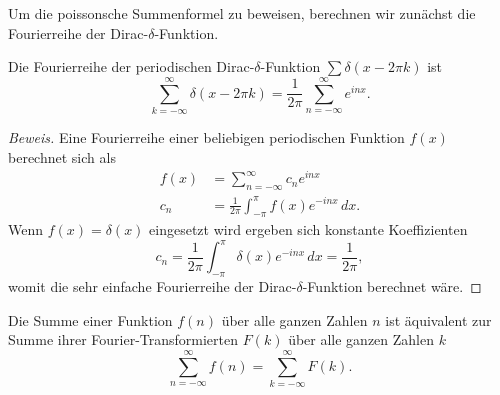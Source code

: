 Um die poissonsche Summenformel zu beweisen, berechnen wir zunächst die Fourierreihe der Dirac-$\delta$-Funktion.

\begin{lemma}
    Die Fourierreihe der periodischen Dirac-$\delta$-Funktion $\sum \delta(x - 2\pi k)$ ist
    \begin{equation} \label{zeta:equation:fourier_dirac}
        \sum_{k=-\infty}^{\infty}
        \delta(x - 2\pi k)
        =
        \frac{1}{2\pi}
        \sum_{n=-\infty}^{\infty}
        e^{i n x}.
    \end{equation}
\end{lemma}

\begin{proof}[Beweis]
    Eine Fourierreihe einer beliebigen periodischen Funktion $f(x)$ berechnet sich als
    \begin{align}
        f(x)
        &=
        \sum_{n=-\infty}^{\infty}
        c_n
        e^{i n x} \\
        c_n
        &=
        \frac{1}{2\pi}
        \int_{-\pi}^{\pi}
        f(x)
        e^{-i n x}
        \, dx.
    \end{align}
    Wenn $f(x)=\delta(x)$ eingesetzt wird ergeben sich konstante Koeffizienten
    \begin{equation}
        c_n
        =
        \frac{1}{2\pi}
        \int_{-\pi}^{\pi}
        \delta(x)
        e^{-i n x}
        \, dx
        =
        \frac{1}{2\pi},
    \end{equation}
    womit die sehr einfache Fourierreihe der Dirac-$\delta$-Funktion berechnet wäre.
\end{proof}

\begin{satz}
%
    Die Summe einer Funktion $f(n)$ über alle ganzen Zahlen $n$ ist äquivalent zur Summe ihrer Fourier-Transformierten $F(k)$ über alle ganzen Zahlen $k$
    \begin{equation}
        \sum_{n=-\infty}^{\infty}
        f(n)
        =
        \sum_{k=-\infty}^{\infty}
        F(k).
    \end{equation}
\end{satz}

